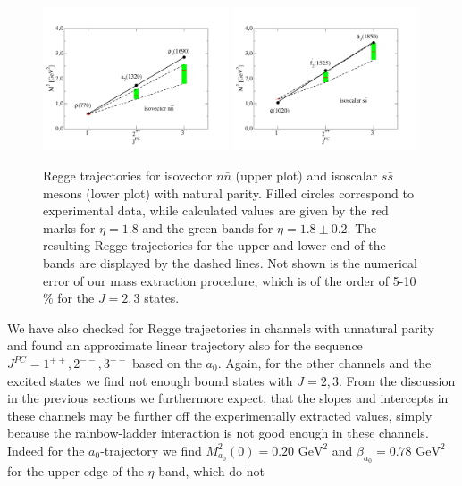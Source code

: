 \begin{figure}[h]
\begin{center}
\includegraphics[width=0.49\textwidth]{figures/reggenn_v2}
\includegraphics[width=0.49\textwidth]{figures/reggess_v2}
\caption{\small Regge trajectories for isovector $n\bar{n}$ (upper plot)
and isoscalar $s\bar{s}$ mesons (lower plot) with natural parity. 
Filled circles correspond to experimental data, while calculated values are given by the red marks
for $\eta = 1.8$ and the green bands for $\eta = 1.8 \pm 0.2$. The resulting Regge trajectories for 
the upper and lower end of the bands are displayed by the dashed lines. Not shown is the numerical
error of our mass extraction procedure, which is of the order of 5-10 $\%$ for the $J=2,3$ states.}\label{fig:regge}
\end{center}
\end{figure}
We have also checked for Regge trajectories in channels with unnatural parity and found an 
approximate linear trajectory also for the sequence $J^{PC}=1^{++}, 2^{--}, 3^{++}$ based 
on the $a_0$. Again, for the other channels and the excited states we find not enough bound 
states with $J=2,3$. From the discussion in the previous sections we furthermore expect, 
that the slopes and intercepts in these channels may be further off the experimentally extracted 
values, simply because the rainbow-ladder interaction is not good enough in these channels. 
Indeed for the $a_0$-trajectory we find $M^2_{a_0}(0) = 0.20\,\, \mbox{GeV}^2$ and
$\beta_{a_0} = 0.78 \,\,\mbox{GeV}^2$ for the upper edge of the $\eta$-band, which do not 

